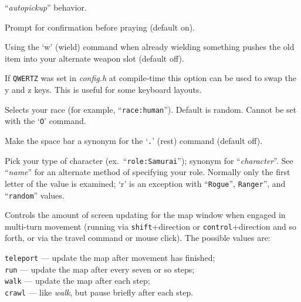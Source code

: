 ``{\it autopickup\/}'' behavior.
\item[\ib{prayconfirm}]
Prompt for confirmation before praying (default on).
\item[\ib{pushweapon}]
Using the `w' (wield) command when already wielding
something pushes the old item into your alternate weapon slot (default off).
\item[\ib{qwertz\_layout}]
If {\tt QWERTZ} was set in {\it config.h} at compile-time this option can be
used to swap the y and z keys. This is useful for some keyboard layouts.
\item[\ib{race}]
Selects your race (for example, ``{\tt race:human}'').  Default is random.
Cannot be set with the `{\tt O}' command.
\item[\ib{rest\_on\_space}]
Make the space bar a synonym for the `{\tt .}' (rest) command (default off).
\item[\ib{role}]
Pick your type of character (ex.\ ``{\tt role:Samurai}'');
synonym for ``{\it character\/}''.  See ``{\it name\/}'' for an alternate method
of specifying your role.  Normally only the first letter of the
value is examined; `r' is an exception with ``{\tt Rogue}'', {\tt Ranger}'',
and ``{\tt random}'' values.
\item[\ib{runmode}]
Controls the amount of screen updating for the map window when engaged
in multi-turn movement (running via {\tt shift}+direction
or {\tt control}+direction
and so forth, or via the travel command or mouse click).
The possible values are:

{\tt teleport} --- update the map after movement has finished;\\
{\tt run} --- update the map after every seven or so steps;\\
{\tt walk} --- update the map after each step;\\
{\tt crawl} --- like {\it walk\/}, but pause briefly after each step.

